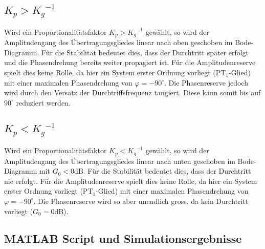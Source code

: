 \subsection{$K_p > {K_g}^{-1}$}
Wird ein Proportionalitätsfaktor $K_p > {K_g}^{-1}$ gewählt, so wird der
Amplitudengang des Übertragungsgliedes linear nach oben geschoben im
Bode-Diagramm. Für die Stabilität bedeutet dies, dass der Durchtritt
später erfolgt und die Phasendrehung bereits weiter propagiert ist.
Für die Amplitudenreserve spielt dies keine Rolle, da hier ein System
erster Ordnung vorliegt (PT$_1$-Glied) mit einer maximalen Phasendrehung
von $\varphi = -90^{\circ}$. Die Phasenreserve jedoch wird durch den
Versatz der Durchtriffsfrequenz tangiert. Diese kann somit bis auf
$90^{\circ}$ reduziert werden.

\subsection{$K_p < {K_g}^{-1}$}
Wird ein Proportionalitätsfaktor $K_p < {K_g}^{-1}$ gewählt, so wird der
Amplitudengang des Übertragungsgliedes linear nach unten geschoben im
Bode-Diagramm mit $G_0 < 0$dB. Für die Stabilität bedeutet dies, dass der
Durchtritt nie erfolgt. Für die Amplitudenreserve spielt dies keine Rolle,
da hier ein System erster Ordnung vorliegt (PT$_1$-Glied) mit einer
maximalen Phasendrehung von $\varphi = -90^{\circ}$. Die Phasenreserve
wird so aber unendlich gross, da kein Durchtritt vorliegt ($G_0 = 0$dB).

\subsection{MATLAB Script und Simulationsergebnisse}





